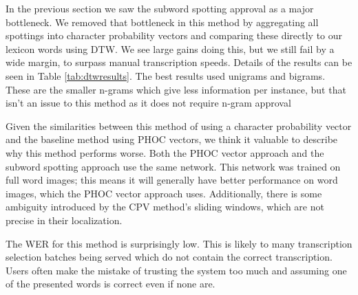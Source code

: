 \documentclass[ms,electronic,twosidetoc,letterpaper,chaptercenter,parttop,lof,lot]{byumsphd}
\begin{document}
In the previous section we saw the subword spotting approval as a major bottleneck. We removed that bottleneck in this method by aggregating all spottings into character probability vectors and comparing these directly to our lexicon words using DTW. We see large gains doing this, but we still fail by a wide margin, to surpass manual transcription speeds. Details of the results can be seen in Table \ref{tab:dtwresults}. The best results used unigrams and bigrams. These are the smaller n-grams which give less information per instance, but that isn't an issue to this method as it does not require n-gram approval %

Given the similarities between this method of using a character probability vector and the baseline method using PHOC vectors, we think it valuable to describe why this method performs worse.
Both the PHOC vector approach and the subword spotting approach use the same network.
This network was trained on full word images; this means it will generally have better performance on word images, which the PHOC vector approach uses. Additionally, there is some ambiguity introduced by the CPV method's sliding windows, which are not precise in their localization.

The WER for this method is surprisingly low. This is likely to many transcription selection batches being served which do not contain the correct transcription. Users often make the mistake of trusting the system too much and assuming one of the presented words is correct even if none are.

\end{document}
